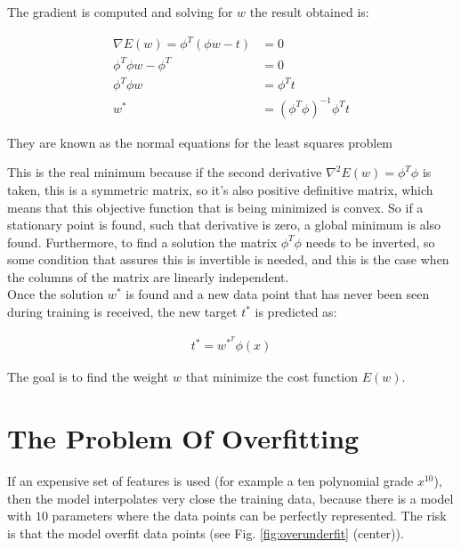 \noindent The gradient is computed and solving for $w$ the result obtained is:
\begin{Equation}[H]
	\centering
	\begin{equation} \label{eq:normeq}
		\begin{aligned}
			\nabla E(w) = \phi^T(\phi w - t) &= 0 \\
			\phi^T \phi w - \phi^T &= 0 \\
			\phi^T \phi w &= \phi^T t \\
			w^* &= (\phi^T \phi)^{-1} \phi^T t
		\end{aligned}
	\end{equation}
	\caption[Normal equations.]{They are known as the normal equations for the least squares problem}
\end{Equation}

\noindent This is the real minimum because if the second derivative $\nabla^2 E(w) = \phi^T \phi$ is taken, this is a symmetric matrix, so it's also positive definitive matrix, which means that this objective function that is being minimized is convex. So if a stationary point is found, such that derivative is zero, a global minimum is also found. Furthermore, to find a solution the matrix $\phi^T \phi$ needs to be inverted, so some condition that assures this is invertible is needed, and this is the case when the columns of the matrix are linearly independent. \\

\noindent Once the solution $w^*$ is found and a new data point that has never been seen during training is received, the new target $t^*$ is predicted as:

\begin{Equation}[H]
	\centering
	\begin{equation} \label{eq:soloptridgereg}
		\begin{aligned}
			t^* = w^{*^T} \phi(x)
		\end{aligned}
	\end{equation}
	\caption[Prediction in ridge regression.]{The goal is to find the weight $w$ that minimize the cost function $E(w)$.}
\end{Equation}

\section{The Problem Of Overfitting}
\label{subsec:poverfitting}
If an expensive set of features is used (for example a ten polynomial grade $x^{10}$), then the model interpolates very close the training data, because there is a model with $10$ parameters where the data points can be perfectly represented. The risk is that the model overfit data points (see Fig. \ref{fig:overunderfit} (center)).

